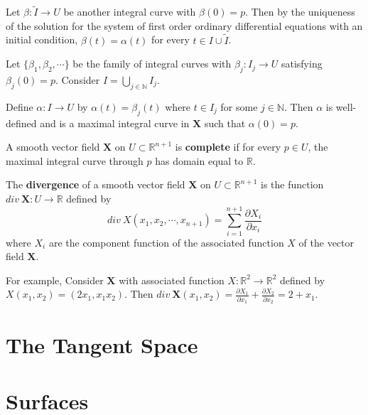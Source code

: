 	Let $\beta : \tilde{I} \to U$ be another integral curve with $\beta(0) = p$. Then by the uniqueness of the solution for the system of first order ordinary differential equations with an initial condition, $\beta(t) = \alpha(t)$ for every $ t \in I \cup \tilde{I}$.

	Let $\{\beta_1,\beta_2,\cdots\}$ be the family of integral curves with $\beta_j : I_j \to U$ satisfying $\beta_j(0) = p$. Consider $I = \bigcup\limits_{j \in \mathbb{N}} I_j$.

	Define $\alpha : I \to U$ by $\alpha(t) = \beta_j(t)$ where $t \in I_j$ for some $j \in \mathbb{N}$. Then $\alpha$ is well-defined and is a maximal integral curve in $\mathbf{X}$ such that $\alpha(0) = p$.

\begin{definition}
	A smooth vector field $\mathbf{X}$ on $U \subset \mathbb{R}^{n+1}$ is \textbf{complete} if for every $p \in U$, the maximal integral curve through $p$ has domain equal to $\mathbb{R}$.
\end{definition}

\begin{definition}
	The \textbf{divergence} of a smooth vector field $\mathbf{X}$ on $U \subset \mathbb{R}^{n+1}$ is the function $div\ \mathbf{X} : U \to \mathbb{R}$ defined by
	\[ div\ X(x_1,x_2,\cdots,x_{n+1}) = \sum_{i=1}^{n+1} \frac{\partial X_i}{\partial x_i} \]
	where $X_i$ are the component function of the associated function $X$ of the vector field $\mathbf{X}$.
\end{definition}

For example, Consider $\mathbf{X}$ with associated function $X : \mathbb{R}^2 \to \mathbb{R}^2$ defined by $X(x_1,x_2) = (2x_1,x_1x_2)$. Then $div\ \mathbf{X}(x_1,x_2) = \frac{\partial X_1}{\partial x_1} + \frac{\partial X_2}{\partial x_2} = 2 + x_1$.

\section{The Tangent Space}

\section{Surfaces}

